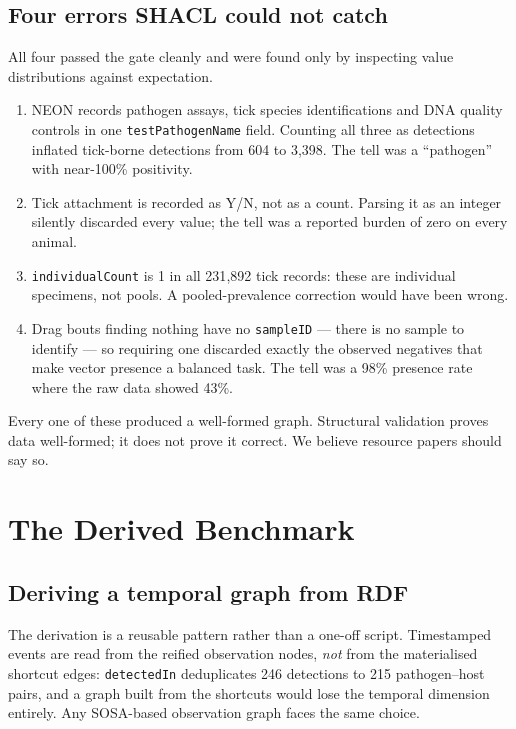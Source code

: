 \subsection{Four errors SHACL could not catch}

All four passed the gate cleanly and were found only by inspecting value
distributions against expectation.

\begin{enumerate}
  \item NEON records pathogen assays, tick species identifications and DNA
        quality controls in one \texttt{testPathogenName} field. Counting all
        three as detections inflated tick-borne detections from 604 to 3{,}398.
        The tell was a ``pathogen'' with near-100\% positivity.
  \item Tick attachment is recorded as Y/N, not as a count. Parsing it as an
        integer silently discarded every value; the tell was a reported burden
        of zero on every animal.
  \item \texttt{individualCount} is 1 in all 231{,}892 tick records: these are
        individual specimens, not pools. A pooled-prevalence correction would
        have been wrong.
  \item Drag bouts finding nothing have no \texttt{sampleID} --- there is no
        sample to identify --- so requiring one discarded exactly the observed
        negatives that make vector presence a balanced task. The tell was a
        98\% presence rate where the raw data showed 43\%.
\end{enumerate}

Every one of these produced a well-formed graph. Structural validation proves
data well-formed; it does not prove it correct. We believe resource papers
should say so.

\section{The Derived Benchmark}
\label{sec:benchmark}

\subsection{Deriving a temporal graph from RDF}

The derivation is a reusable pattern rather than a one-off script. Timestamped
events are read from the reified observation nodes, \emph{not} from the
materialised shortcut edges: \texttt{detectedIn} deduplicates 246 detections to
215 pathogen--host pairs, and a graph built from the shortcuts would lose the
temporal dimension entirely. Any SOSA-based observation graph faces the same
choice.

